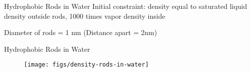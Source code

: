 \documentclass{beamer}
\begin{document}
\begin{frame}[fragile]{Hydrophobic Rods in Water}
Initial constraint: density equal to saturated liquid density outside rods, 1000 times vapor density inside
\begin{figure}
\begin{center}
\end{center}
\end{figure} 
Diameter of rods = 1 nm (Distance apart = 2nm)
\end{frame}

\begin{frame}[fragile]{Hydrophobic Rods in Water}
\begin{figure}
\begin{center}
\texttt{[image: figs/density-rods-in-water]}
\end{center}
\end{figure} 
\end{frame}
\end{document}
